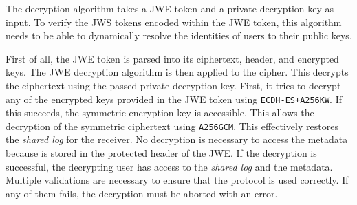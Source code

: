 \documentclass[../main.tex]{subfiles}
\begin{document}
The decryption algorithm takes a JWE token and a private decryption key as input.
To verify the JWS tokens encoded within the JWE token, this algorithm needs to be able to dynamically resolve the identities of users to their public keys.

First of all, the JWE token is parsed into its ciphertext, header, and encrypted keys.
The JWE decryption algorithm is then applied to the cipher.
This decrypts the ciphertext using the passed private decryption key.
First, it tries to decrypt any of the encrypted keys provided in the JWE token using \verb|ECDH-ES+A256KW|.
If this succeeds, the symmetric encryption key is accessible.
This allows the decryption of the symmetric ciphertext using \verb|A256GCM|.
This effectively restores the \emph{shared log} for the receiver.
No decryption is necessary to access the metadata because is stored in the protected header of the JWE.
If the decryption is successful, the decrypting user has access to the \emph{shared log} and the metadata.
Multiple validations are necessary to ensure that the protocol is used correctly.
If any of them fails, the decryption must be aborted with an error.
\end{document}
